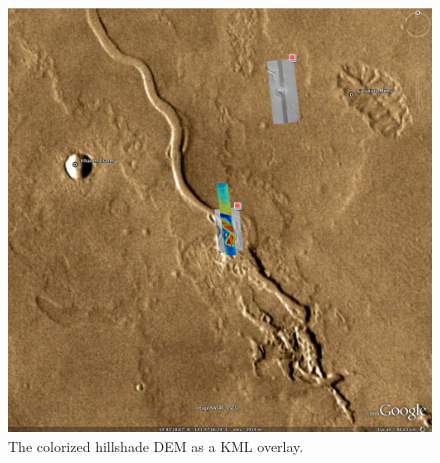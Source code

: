 \begin{figure}[b!]
\begin{center}
\includegraphics[width=6in]{images/p19-googlemars.png}
\caption[Hrad shaded colorized DEM as a KML overlay] {
    \label{hrad-kml}
        The colorized hillshade DEM as a KML overlay.
    }
\end{center}
\end{figure}
